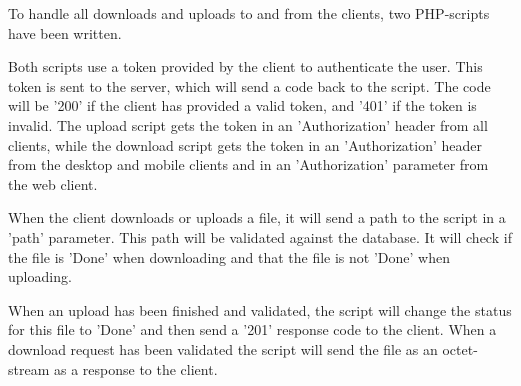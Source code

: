To handle all downloads and uploads to and from the clients, two PHP-scripts have been written. 

Both scripts use a token provided by the client to authenticate the user. This token is sent to the server, which will send a code back to the script. The code will be '200' if the client has provided a valid token, and '401' if the token is invalid. The upload script gets the token in an 'Authorization' header from all clients, while the download script gets the token in an 'Authorization' header from the desktop and mobile clients and in an 'Authorization' parameter from the web client.

When the client downloads or uploads a file, it will send a path to the script in a 'path' parameter. This path will be validated against the database. It will check if the file is 'Done' when downloading and that the file is not 'Done' when uploading.

When an upload has been finished and validated, the script will change the status for this file to 'Done' and then send a '201' response code to the client. When a download request has been validated the script will send the file as an octet-stream as a response to the client.
